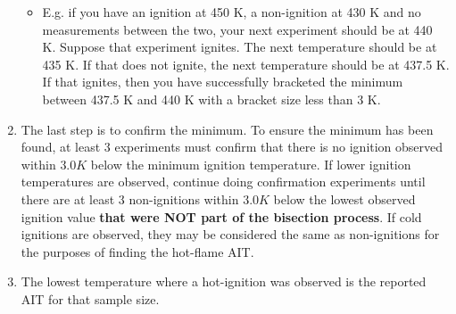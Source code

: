 \begin{enumerate}
  \begin{itemize}
  \tightlist
  \item
    E.g. if you have an ignition at 450 K, a non-ignition at 430 K and
    no measurements between the two, your next experiment should be at
    440 K. Suppose that experiment ignites. The next temperature should
    be at 435 K. If that does not ignite, the next temperature should be
    at 437.5 K. If that ignites, then you have successfully bracketed
    the minimum between 437.5 K and 440 K with a bracket size less than
    3 K.
  \end{itemize}
\item
  The last step is to confirm the minimum. To ensure the minimum has
  been found, at least 3 experiments must confirm that there is no
  ignition observed within \(3.0 K\) below the minimum ignition
  temperature. If lower ignition temperatures are observed, continue
  doing confirmation experiments until there are at least 3
  non-ignitions within \(3.0K\) below the lowest observed ignition value
  \textbf{that were NOT part of the bisection process}. If cold
  ignitions are observed, they may be considered the same as
  non-ignitions for the purposes of finding the hot-flame AIT.
\item
  The lowest temperature where a hot-ignition was observed is the
  reported AIT for that sample size.
\end{enumerate}

